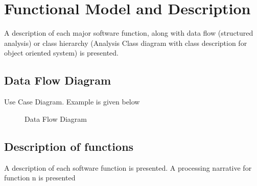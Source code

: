 \documentclass[oneside,a4paper,12pt]{report}
\begin{document}
 
\section{Functional Model and Description}  
A description of each major software function, along with data flow (structured analysis) or class hierarchy (Analysis Class diagram with class description for object oriented system) is presented. 
\subsection{Data Flow Diagram}  
Use Case Diagram. Example is given below
\begin{center}
	\begin{figure}[H]
		\centering
	  \caption{Data Flow Diagram}
	  \label{fig:usecase}
	\end{figure}
\end{center} 
 
\subsection{Description of functions}  
A description of each software function is presented. A processing narrative for function n is presented
 
\end{document}
